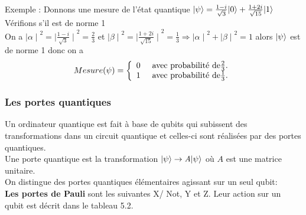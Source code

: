 \documentclass[12pt,openany]{report}
\DeclarePairedDelimiter\ket{\lvert}{\rangle}
\begin{document}
Exemple : Donnons une mesure de l'état quantique  $  \ket{\psi}=\frac{1-i}{\sqrt{3}} \ket{0}+ 
\frac{1+2i}{\sqrt{15}} \ket{1} $\\  Vérifions s'il est de norme 1 \\ On a $  {\mid \alpha \mid}^2 ={\mid \frac{1-i}{\sqrt{3}} \mid}^2= \frac{2}{3} $ et 
$  {\mid \beta \mid}^2 ={\mid \frac{1+2i}{\sqrt{15}} \mid}^2= \frac{1}{3} \Rightarrow {\mid \alpha \mid}^2 + {\mid \beta \mid}^2 =1 $ alors $ \ket{\psi}$ est de norme 1  donc on a 
\[  Mesure(\psi)=
\left \{
\begin{array}{c c}
0 \hspace{0.5cm} \text{avec probabilité de} \frac{2}{3}.\\
1 \hspace{0.5cm} \text{avec probabilité de} \frac{1}{3}.
  
\end{array}
\right.
\]

\subsubsection{Les portes quantiques}
Un ordinateur quantique est fait à base de qubits qui subissent des transformations dans un circuit quantique et celles-ci sont réalisées par des portes quantiques. \\ Une porte quantique est la transformation $ \ket{\psi}\rightarrow \mathit{A}\ket{\psi}  $ où $\mathit{A} $ est une matrice unitaire.\\
On distingue des portes quantiques élémentaires agissant sur un seul qubit:\\ 

\textbf{Les  portes de Pauli} sont les suivantes  X/ Not, Y et Z. Leur action sur un qubit est décrit dans le tableau 5.2.
\end{document}
